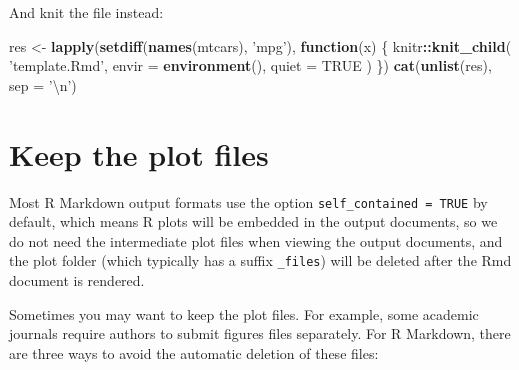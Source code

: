 \documentclass[
  11pt,
]{krantz}
\newenvironment{Shaded}{\begin{snugshade}}{\end{snugshade}}
\newcommand{\CharTok}[1]{\textcolor[rgb]{0.5,0.5,0.5}{#1}}
\newcommand{\ControlFlowTok}[1]{\textcolor[rgb]{0.27,0.27,0.27}{\textbf{#1}}}
\newcommand{\DataTypeTok}[1]{\textcolor[rgb]{0.27,0.27,0.27}{#1}}
\newcommand{\KeywordTok}[1]{\textcolor[rgb]{0.27,0.27,0.27}{\textbf{#1}}}
\newcommand{\NormalTok}[1]{#1}
\newcommand{\OperatorTok}[1]{\textcolor[rgb]{0.43,0.43,0.43}{\textbf{#1}}}
\newcommand{\OtherTok}[1]{\textcolor[rgb]{0.37,0.37,0.37}{#1}}
\newcommand{\StringTok}[1]{\textcolor[rgb]{0.5,0.5,0.5}{#1}}
\begin{document}
And knit the file instead:

\begin{Shaded}
\begin{Highlighting}[]
\NormalTok{res <-}\StringTok{ }\KeywordTok{lapply}\NormalTok{(}\KeywordTok{setdiff}\NormalTok{(}\KeywordTok{names}\NormalTok{(mtcars), }\StringTok{'mpg'}\NormalTok{), }\ControlFlowTok{function}\NormalTok{(x) \{}
\NormalTok{  knitr}\OperatorTok{::}\KeywordTok{knit_child}\NormalTok{(}
    \StringTok{'template.Rmd'}\NormalTok{, }\DataTypeTok{envir =} \KeywordTok{environment}\NormalTok{(), }\DataTypeTok{quiet =} \OtherTok{TRUE}
\NormalTok{  )}
\NormalTok{\})}
\KeywordTok{cat}\NormalTok{(}\KeywordTok{unlist}\NormalTok{(res), }\DataTypeTok{sep =} \StringTok{'}\CharTok{\textbackslash{}n}\StringTok{'}\NormalTok{)}
\end{Highlighting}
\end{Shaded}

\hypertarget{keep-files}{%
\section{Keep the plot files}\label{keep-files}}

Most R Markdown output formats use the option \texttt{self\_contained\ =\ TRUE} by default, which means R plots will be embedded in the output documents, so we do not need the intermediate plot files when viewing the output documents, and the plot folder (which typically has a suffix \texttt{\_files}) will be deleted after the Rmd document is rendered.

Sometimes you may want to keep the plot files. For example, some academic journals require authors to submit figures files separately. For R Markdown, there are three ways to avoid the automatic deletion of these files:
\end{document}
